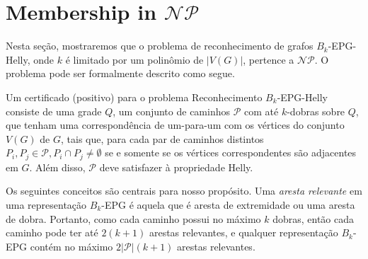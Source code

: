 \section{Membership in $\mathcal{NP}$} \label{sec:NPpert}

Nesta seção, mostraremos que o problema de reconhecimento de grafos $B_k$-EPG-Helly, onde $k$ é limitado por um polinômio de $|V(G)|$, pertence a  $\mathcal{NP}$. O problema pode ser formalmente descrito como segue.



Um certificado (positivo) para o problema {\sc Reconhecimento $B_k$-EPG-Helly} consiste de uma grade $Q$, um conjunto de caminhos $\mathcal{P}$ com até $k$-dobras sobre $Q$, que tenham uma correspondência de um-para-um com os vértices do conjunto $V(G)$ de $G$, tais que, para cada par de caminhos distintos $P_i, P_j\in \mathcal{P}, P_i\cap P_j \neq \emptyset $  se e somente se os vértices correspondentes são adjacentes em $G$. Além disso, $\mathcal{P}$ deve satisfazer à propriedade Helly.

Os seguintes conceitos são centrais para nosso propósito.
Uma \emph{aresta relevante} em uma representação $B_k$-EPG é aquela que é aresta de extremidade ou uma aresta de dobra. Portanto, como cada caminho possui no máximo $k$ dobras, então cada caminho pode ter até $2(k+1)$ arestas relevantes, e qualquer representação $B_k$-EPG contém no máximo $2|\mathcal{P}|(k+1)$ arestas relevantes.




